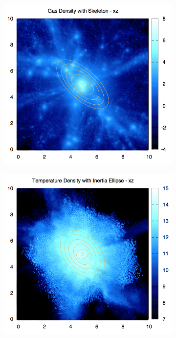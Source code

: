 \documentclass[journal]{IEEEtran}
\begin{document}
\begin{figure}[!t]
\begin{subfigure}[t]{0.3\textwidth}
	\end{subfigure}
	\quad
	\begin{subfigure}[t]{0.3\textwidth}
		\centering
		\includegraphics[width=\linewidth]{GasDenEllipxz.png}
	\end{subfigure}
	\quad
	\begin{subfigure}[t]{0.3\textwidth}
		\centering
		\includegraphics[width=\linewidth]{TempDenEllipxz.png}

\end{subfigure}
\end{figure}
\end{document}

